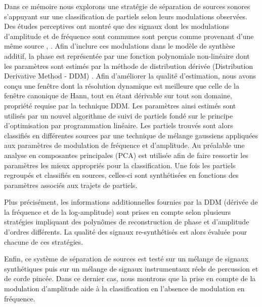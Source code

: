 Dans ce mémoire nous explorons une stratégie de séparation de sources sonores
s’appuyant sur une classification de partiels selon leurs modulations observées.
Des études perceptives ont montré que des signaux dont les modulations
d’amplitude et de fréquence sont communes sont perçus comme provenant d’une même
source \cite{mcadams1989segregation}, \cite{marin1991segregation}. Afin
d’inclure ces modulations dans le modèle de synthèse additif, la phase est
représentée par une fonction polynomiale non-linéaire dont les paramètres sont
estimés par la méthode de distribution dérivée (Distribution Derivative Method -
DDM) \cite{betser2009sinusoidal}. Afin d’améliorer la qualité d’estimation, nous
avons conçu une fenêtre dont la résolution dynamique est meilleure que celle de
la fenêtre canonique de Hann, tout en étant dérivable sur tout son domaine,
propriété requise par la technique DDM. Les paramètres ainsi estimés sont
utilisés par un nouvel algorithme de suivi de partiels fondé sur le principe
d’optimisation par programmation linéaire. Les partiels trouvés sont alors
classifiés en différentes sources par une technique de mélange gaussiens
appliquées aux paramètres de modulation de fréquence et d’amplitude. Au
préalable une analyse en composantes principales (PCA) est utilisée afin de
faire ressortir les paramètres les mieux appropriés pour la classification.  Une
fois les partiels regroupés et classifiés en sources, celles-ci sont
synthétisées en fonctions des paramètres associés aux trajets de partiels.

Plus précisément, les informations additionnelles fournies par la DDM (dérivée
de la fréquence et de la log-amplitude) sont prises en compte selon plusieurs
stratégies impliquant des polynômes de reconstruction de phase et d’amplitude
d’ordres différents. La qualité des signaux re-synthétisés est alors évaluée
pour chacune de ces stratégies. 

Enfin, ce système de séparation de sources est testé sur un mélange de signaux
synthétiques puis sur un mélange de signaux instrumentaux réels de percussion et
de corde pincée. Dans ce dernier cas, nous montrons que la prise en compte de la
modulation d’amplitude aide à la classification en l’absence de modulation en
fréquence.
